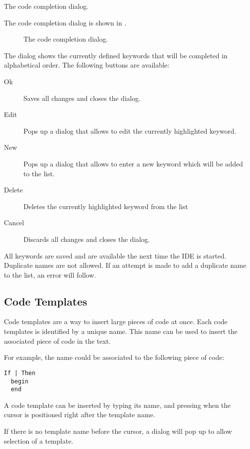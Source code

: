 \begin{htmlonly}
The code completion dialog.
\end{htmlonly}
\begin{latexonly}
The code completion dialog is shown in .
\begin{figure}[ht]
\begin{center}
\caption{The code completion dialog.}\label{fig:codecomp}
\ifpdf
{}
\else
{}
\fi
\end{center}
\end{figure}
\end{latexonly}
The dialog shows the currently defined keywords that will be completed in
alphabetical order.
The following buttons are available:
\begin{description}
\item[Ok] Saves all changes and closes the dialog.
\item[Edit] Pops up a dialog that allows to edit the currently 
highlighted keyword.
\item[New] Pops up a dialog that allows to enter a new keyword which will be
added to the list.
\item[Delete] Deletes the currently highlighted keyword from the list
\item[Cancel] Discards all changes and closes the dialog.
\end{description}
All keywords are saved and are available the next time the IDE is started.
Duplicate names are not allowed. If an attempt is made to add a duplicate
name to the list, an error will follow.

\subsection{Code Templates}
Code templates are a way to insert large pieces of code at once. Each 
code templates is identified by a unique name. This name can be used to
insert the associated piece of code in the text.

For example, the name  could be associated to the following
piece of code:
\begin{verbatim}
If | Then
  begin
  end
\end{verbatim}
A code template can be inserted by typing its name, and pressing 
when the cursor is positioned right after the template name.

If there is no template name before the cursor, a dialog will pop up to
allow selection of a template.

